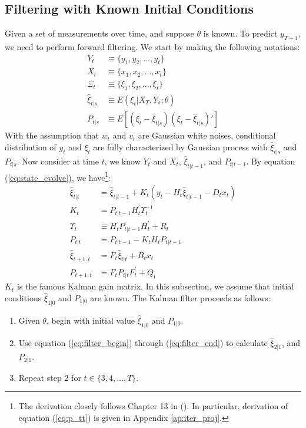 \documentclass[10pt, titlepage]{article}
\newenvironment{boenumerate}
    {\begin{enumerate}\renewcommand\labelenumi{\textbf\theenumi}}
    {\end{enumerate}}
\numberwithin{equation}{section}
\begin{document}
\subsection{Filtering with Known Initial Conditions}
Given a set of measurements over time, and suppose $\theta$ is known. To predict $y_{T+1}$, we need to perform forward filtering. We start by making the following notations:
\begin{align*}
    Y_t &\equiv \{y_1, y_2, ..., y_t\} \\
    X_t &\equiv \{x_1, x_2, ..., x_t\} \\
    \Xi_t &\equiv \{\xi_1,\xi_2,...,\xi_t\} \\
    \hat{\xi}_{t|s} &\equiv E(\xi_t|X_{T},Y_{s};\theta) \\
    P_{t|s} &\equiv E[(\xi_t-\hat{\xi}_{t|s})(\xi_t-\hat{\xi}_{t|s})']
\end{align*}
With the assumption that $w_t$ and $v_t$ are Gaussian white noises, conditional distribution of $y_t$ and $\xi_t$ are fully characterized by Gaussian process with $\hat{\xi}_{t|s}$ and $P_{t|s}$. Now consider at time $t$, we know $Y_t$ and $X_t$, $\hat{\xi}_{t|t-1}$, and $P_{t|t-1}$. By equation (\ref{eq:state_evolve}), we have\footnote{The derivation closely follows Chapter 13 in (\cite{hamilton_1994}). In particular, derivation of equation (\ref{eq:p_tt}) is given in Appendix \ref{ap:iter_proj}.}:
\begin{align}
    \hat{\xi}_{t|t} &= \hat{\xi}_{t|t-1} + K_t(y_t-H_t\hat{\xi}_{t|t-1}-D_tx_t) \label{eq:filter_begin} \\
    K_t &= P_{t|t-1}H_t^{'}\Upsilon_t^{-1} \label{eq:gain} \\
    \Upsilon_t &\equiv H_tP_{t|t-1}H_t^{'} + R_t \\
    P_{t|t} &= P_{t|t-1} - K_tH_tP_{t|t-1} \label{eq:p_tt} \\
    \hat{\xi}_{t+1,t} &= F_t\hat{\xi}_{t|t} + B_tx_t \label{eq:xi_t1} \\
    P_{t+1,t} &= F_tP_{t|t}F_t^{'}+Q_t \label{eq:filter_end}
\end{align}
$K_t$ is the famous Kalman gain matrix. In this subsection, we assume that initial conditions $\hat{\xi}_{1|0}$ and $P_{1|0}$ are known. The Kalman filter proceeds as follows:
\begin{boenumerate}
    \item Given $\theta$, begin with initial value $\hat{\xi}_{1|0}$ and $P_{1|0}$.
    \item Use equation (\ref{eq:filter_begin}) through (\ref{eq:filter_end}) to calculate $\hat{\xi}_{2|1}$, and $P_{2|1}$.
    \item Repeat step 2 for $t\in\{3, 4, ..., T\}$.
\end{boenumerate}
\end{document}
